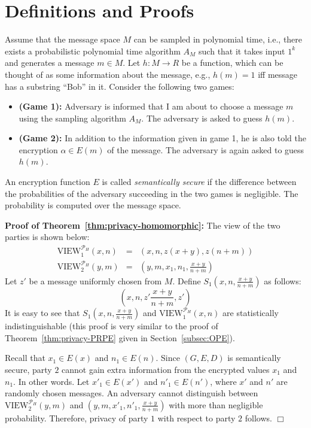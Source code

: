 \section{Definitions and Proofs}
\label{appendix:definitions-proofs}

\begin{definition}
\label{def:semantic-secure}
\rm
Assume that the message space $M$ can be sampled in polynomial time,
i.e., there exists a probabilistic polynomial time algorithm $A_M$ such
that it takes input $1^k$ and generates a message $m \in M$. Let $h : M \rightarrow R$
be a function, which can be thought of as  some information about the message, e.g.,
$h(m)=1$ iff message has a substring ``Bob'' in it. Consider the following two games:
\begin{itemize}
\item {\bf (Game 1):} Adversary is informed that I am about to choose a message $m$ using
the sampling algorithm $A_M$. The adversary is  asked to guess $h(m)$.

\item {\bf (Game 2):} In addition to the information given in game 1, he is also told
the encryption $\alpha \in E(m)$ of the message. The adversary is again asked to guess $h(m)$.
\end{itemize}
An encryption function $E$ is called {\em semantically secure} if the difference
between the probabilities of the adversary succeeding in the two games is negligible. The 
probability is computed over the message space.
\end{definition}

\noindent
{\bf Proof of Theorem~\ref{thm:privacy-homomorphic}:} The view of the two parties is shown below:
\begin{eqnarray*}
\mbox{VIEW}_1^{\mathcal{P}_H} (x,n) & = & (x,n, z (x+y), z (n+m)) \\
\mbox{VIEW}_2^{\mathcal{P}_H} (y,m) & = & (y,m,x_1,n_1,\frac{x+y}{n+m})
\end{eqnarray*}
Let $z'$ be a message uniformly chosen from $M$. Define $S_1 (x,n,\frac{x+y}{n+m})$ as follows:
\[
(x,n, z' \frac{x+y}{n+m}, z')
\]
It is easy to see that $S_1 (x,n,\frac{x+y}{n+m})$ and
$\mbox{VIEW}_1^{\mathcal{P}_H} (x,n)$ are statistically
indistinguishable (this proof is very similar to the proof of
Theorem~\ref{thm:privacy-PRPE} given in Section~\ref{subsec:OPE}).

Recall that $x_1 \in E(x)$ and $n_1 \in E(n)$. Since $(G,E,D)$ is
semantically secure, party $2$ cannot gain extra information from the
encrypted values $x_1$ and $n_1$.  In other words. Let $x'_1 \in
E(x')$ and $n'_1 \in E(n')$, where $x'$ and $n'$ are randomly chosen
messages. An adversary cannot distinguish between
$\mbox{VIEW}_2^{\mathcal{P}_H} (y,m)$ and
$(y,m,x'_1,n'_1,\frac{x+y}{n+m})$ with more than negligible
probability.  Therefore, privacy of party $1$ with respect to party $2$
follows.  $\Box$

